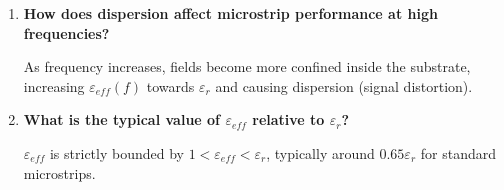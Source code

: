 \documentclass[10pt,a4paper]{article}
\newcommand{\Q}[1]{\textbf{#1}\par\vspace{2pt}}
\begin{document}
\begin{tcolorbox}[exambox, title={\textbf{Frequently Asked / Viva Questions}}]
\begin{enumerate}[topsep=0pt, label=\textbf{Q\arabic*.}, itemsep=5pt]
    \item \Q{How does dispersion affect microstrip performance at high frequencies?}
    As frequency increases, fields become more confined inside the substrate, increasing $\varepsilon_{eff}(f)$ towards $\varepsilon_r$ and causing dispersion (signal distortion).

    \item \Q{What is the typical value of $\varepsilon_{eff}$ relative to $\varepsilon_r$?}
    $\varepsilon_{eff}$ is strictly bounded by $1 < \varepsilon_{eff} < \varepsilon_r$, typically around $0.65\varepsilon_r$ for standard microstrips.
  \end{enumerate}
\end{tcolorbox}
\end{document}
